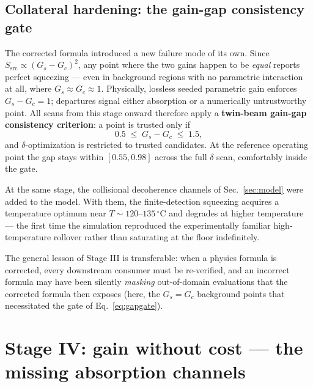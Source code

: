 \documentclass[11pt,a4paper]{article}
\newcommand{\degC}{\,^{\circ}\mathrm{C}}
\begin{document}
\subsection{Collateral hardening: the gain-gap consistency gate}
The corrected formula introduced a new failure mode of its own. Since
$S_{\mathrm{src}}\propto(G_s-G_c)^2$, any point where the two gains happen
to be \emph{equal} reports perfect squeezing --- even in background regions
with no parametric interaction at all, where $G_s\approx G_c\approx 1$.
Physically, lossless seeded parametric gain enforces $G_s-G_c=1$; departures
signal either absorption or a numerically untrustworthy point. All scans
from this stage onward therefore apply a \textbf{twin-beam gain-gap
consistency criterion}: a point is trusted only if
\begin{equation}
0.5 \;\le\; G_s-G_c \;\le\; 1.5 ,
\label{eq:gapgate}
\end{equation}
and $\delta$-optimization is restricted to trusted candidates. At the
reference operating point the gap stays within $[0.55,0.98]$ across the
full $\delta$ scan, comfortably inside the gate.

At the same stage, the collisional decoherence channels of
Sec.~\ref{sec:model} were added to the model. With them, the
finite-detection squeezing acquires a temperature optimum near
$T\sim 120$--$135\degC$ and degrades at higher temperature --- the first time the simulation
reproduced the experimentally familiar high-temperature rollover rather than
saturating at the floor indefinitely.

The general lesson of Stage III is transferable: when a physics formula is
corrected, every downstream consumer must be re-verified, and an incorrect
formula may have been silently \emph{masking} out-of-domain evaluations that
the corrected formula then exposes (here, the $G_s=G_c$ background points
that necessitated the gate of Eq.~\eqref{eq:gapgate}).

\section{Stage IV: gain without cost --- the missing absorption channels}
\label{sec:stage4}
\end{document}

